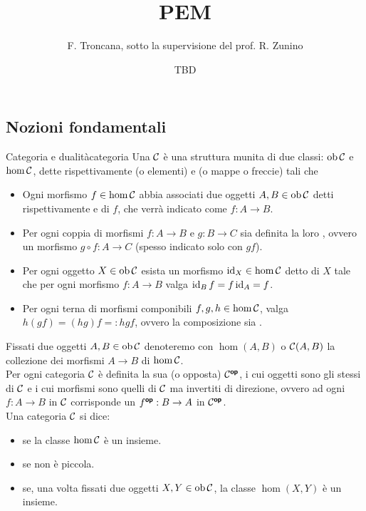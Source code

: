 \documentclass{article}
\title{PEM}
\author{F. Troncana, sotto la supervisione del prof. R. Zunino}
\date{TBD}
\renewcommand\C{\mc{C}}
\begin{document}
\maketitle

\subsection{Nozioni fondamentali}

\begin{definition}{Categoria e dualità}{categoria}
    Una  $\C$ è una struttura munita di due classi: $\ob\C$ e $\hom\C$, dette rispettivamente  (o elementi) e  (o mappe o freccie) tali che \begin{itemize}
        \item Ogni morfismo $f \in \hom\C$ abbia associati due oggetti $A,B \in \ob\C$ detti rispettivamente  e  di $f$, che verrà indicato come $f : A\to B$.
        \item Per ogni coppia di morfismi $f:A\to B$ e $g : B\to C$ sia definita la loro , ovvero un morfismo $g\circ f : A \to C$ (spesso indicato solo con $gf$).
        \item Per ogni oggetto $X \in \ob\C$ esista un morfismo $\id_X \in \hom\C$ detto  di $X$ tale che per ogni morfismo $f:A\to B$ valga $\operatorname{id}_B f = f \operatorname{id}_A = f$.
        \item Per ogni terna di morfismi componibili $f,g,h \in \hom\C$, valga $h(gf) = (hg)f =: hgf$, ovvero la composizione sia .
    \end{itemize}
    Fissati due oggetti $A,B \in \ob\C$ denoteremo con $\hom(A,B)$ o $\C(A,B)$ la collezione dei morfismi $A\to B$ di $\hom\C$.\\
    Per ogni categoria $\C$ è definita la sua  (o opposta) $\C^\op$, i cui oggetti sono gli stessi di $\C$ e i cui morfismi sono quelli di $\C$ ma invertiti di direzione, ovvero ad ogni $f:A\to B$ in $\C$ corrisponde un $f^{\text{\sffamily\textbf{op}}} : B\to A$ in $\C^\op$.\\
    Una categoria $\C$ si dice:\begin{itemize}
        \item {} se la classe $\hom\C$ è un insieme.
        \item {} se non è piccola.
        \item {} se, una volta fissati due oggetti $X,Y \in \ob\C$, la classe $\hom(X,Y)$ è un insieme.
    \end{itemize}
\end{definition}
\end{document}
